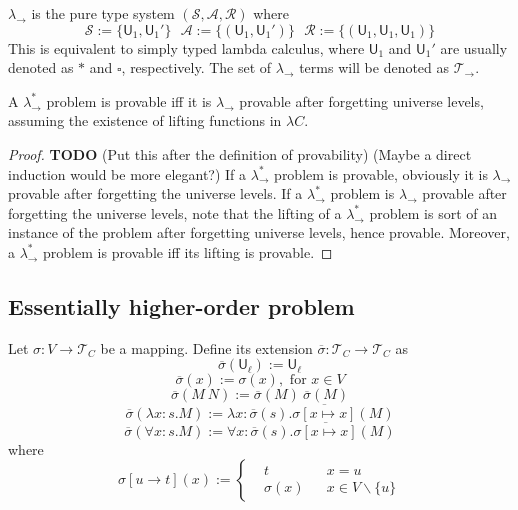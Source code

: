 \begin{definition} $\lambda_\to$ is the pure type system $(\mathcal{S}, \mathcal{A}, \mathcal{R})$ where
  $$\mathcal{S} := \{\mathsf{U}_1, \mathsf{U}_1'\} \ \ \ \mathcal{A} := \{(\mathsf{U}_1, \mathsf{U}_1')\} \ \ \ 
    \mathcal{R} := \{(\mathsf{U}_1, \mathsf{U}_1, \mathsf{U}_1)\}$$
  This is equivalent to simply typed lambda calculus, where $\mathsf{U}_1$ and $\mathsf{U}_1'$ are
  usually denoted as $*$ and $\square$, respectively. The set of $\lambda_\to$ terms will be denoted
  as $\mathcal{T}_\to$.
\end{definition}

\begin{theorem} A $\lambda_\to^*$ problem is provable iff it is $\lambda_\to$ provable after forgetting
  universe levels, assuming the existence of lifting functions in $\lambda C$.
\end{theorem}
\begin{proof} \textbf{TODO}
  (Put this after the definition of provability)
  (Maybe a direct induction would be more elegant?)
  If a $\lambda_\to^*$ problem is provable, obviously it is $\lambda_\to$ provable
  after forgetting the universe levels. If a $\lambda_\to^*$ problem is $\lambda_\to$ provable
  after forgetting the universe levels, note that the lifting of a $\lambda_\to^*$ problem is sort of
  an instance of the problem after forgetting universe levels, hence provable. Moreover,
  a $\lambda_\to^*$ problem is provable iff its lifting is provable.  
\end{proof}

\subsection{Essentially higher-order problem}

\begin{definition} Let $\sigma : V \to \mathcal{T}_C$ be a mapping.
  Define its extension $\overline{\sigma} : \mathcal{T}_C \to \mathcal{T}_C$ as
  $$\overline{\sigma}(\mathsf{U}_\ell) := \mathsf{U}_\ell$$
  $$\overline{\sigma}(x) := \sigma(x), \text{ for }x \in V$$
  $$\overline{\sigma}(M \ N) := \overline{\sigma}(M) \ \overline{\sigma}(M)$$
  $$\overline{\sigma}(\lambda x : s. M) := \lambda x : \overline{\sigma}(s). \overline{\sigma[x \mapsto x]}(M)$$
  $$\overline{\sigma}(\forall x : s. M) := \forall x : \overline{\sigma}(s). \overline{\sigma[x \mapsto x]}(M)$$
  where
  $$\sigma[u \to t](x) := \left\{\begin{aligned}
    & t & & x = u \\
    & \sigma(x) & & x \in V \backslash \{u\}
  \end{aligned}\right.$$
\end{definition}

